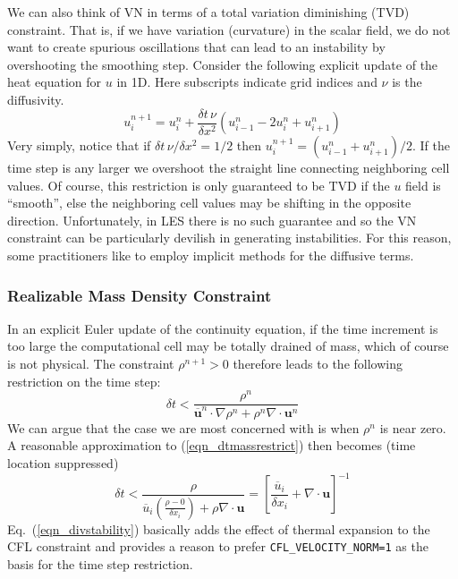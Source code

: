 \documentclass[11pt]{book}
\newcommand{\ct}{\tt\small}
\newcommand{\be}{\begin{equation}}
\newcommand{\ee}{\end{equation}}
\begin{document}
We can also think of VN in terms of a total variation diminishing (TVD) constraint.  That is, if we have variation (curvature) in the scalar field, we do not want to create spurious oscillations that can lead to an instability by overshooting the smoothing step.  Consider the following explicit update of the heat equation for $u$ in 1D. Here subscripts indicate grid indices and $\nu$ is the diffusivity.
\begin{equation}
u_i^{n+1} = u_i^n + \frac{\delta t \, \nu}{\delta x^2} (u_{i-1}^n - 2u_i^n + u_{i+1}^n )
\end{equation}
Very simply, notice that if $\delta t \, \nu/\delta x^2 = 1/2$ then $u_i^{n+1} = (u_{i-1}^n + u_{i+1}^n)/2$.  If the time step is any larger we overshoot the straight line connecting neighboring cell values.  Of course, this restriction is only guaranteed to be TVD if the $u$ field is ``smooth'', else the neighboring cell values may be shifting in the opposite direction.  Unfortunately, in LES there is no such guarantee and so the VN constraint can be particularly devilish in generating instabilities. For this reason, some practitioners like to employ implicit methods for the diffusive terms.

\subsubsection{Realizable Mass Density Constraint}

In an explicit Euler update of the continuity equation, if the time increment is too large the computational cell may be totally drained of mass, which of course is not physical. The constraint $\rho^{n+1}>0$ therefore leads to the following restriction on the time step:
\begin{equation}
\label{eqn_dtmassrestrict}
\delta t < \frac{\rho^n}{\overline{\mathbf{u}}^n\cdot\nabla\rho^n + \rho^n \nabla\cdot\mathbf{u}^n}
\end{equation}
We can argue that the case we are most concerned with is when $\rho^n$ is near zero.  A reasonable approximation to (\ref{eqn_dtmassrestrict}) then becomes (time location suppressed)
\be
\label{eqn_divstability}
\delta t < \frac{\rho}{\overline{u}_i \left(\frac{\rho-0}{\delta x_i}\right) + \rho \nabla\cdot\mathbf{u}}
  = \left[ \frac{\overline{u}_i}{\delta x_i} + \nabla\cdot\mathbf{u} \right]^{-1}
\ee
Eq.~(\ref{eqn_divstability}) basically adds the effect of thermal expansion to the CFL constraint and provides a reason to prefer {\ct CFL\_VELOCITY\_NORM=1}
as the basis for the time step restriction.
\end{document}
